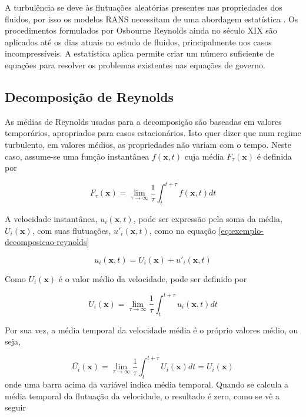 A turbulência se deve às flutuações aleatórias presentes nas propriedades dos fluidos, por isso os modelos RANS necessitam de uma abordagem estatística \cite{Wilcox2006}. Os procedimentos formulados por Osbourne Reynolds ainda no século XIX são aplicados até os dias atuais no estudo de fluidos, principalmente nos casos incompressíveis. A estatística aplica permite criar um número suficiente de equações para resolver os problemas existentes nas equações de governo.

\subsection{Decomposição de Reynolds}

As médias de Reynolds usadas para a decomposição são baseadas em valores temporários, apropriados para casos estacionários. Isto quer dizer que num regime turbulento, em valores médios, as propriedades não variam com o tempo. Neste caso, assume-se uma função instantânea \(f(\textbf{x},t)\) cuja média \(F_{\tau}(\textbf{x})\) é definida por

\begin{equation}
	F_{\tau}(\textbf{x}) = \lim_{\tau \rightarrow \infty} \frac{1}{\tau}\int_{t}^{t+\tau}f(\textbf{x},t)dt
\end{equation}

A velocidade instantânea, \(u_i(\textbf{x},t)\), pode ser expressão pela soma da média, \(U_i(\textbf{x})\), com suas flutuações, \(u'_i(\textbf{x},t)\), como na equação \ref{eq:exemplo-decomposicao-reynolds}

\begin{equation}
	\label{eq:exemplo-decomposicao-reynolds}
	u_{i}(\textbf{x},t) = U_{i}(\textbf{x}) + u'_{i}(\textbf{x},t)
\end{equation} 

Como \(U_{i}(\textbf{x})\) é o valor médio da velocidade, pode ser definido por 

\begin{equation}
	U_{i}(\textbf{x}) = \lim_{\tau \rightarrow \infty} \frac{1}{\tau}\int_{t}^{t+\tau}u_i(\textbf{x},t)dt
\end{equation}

Por sua vez, a média temporal da velocidade média é o próprio valores médio, ou seja,

\begin{equation}
	\overline{U_{i}}(\textbf{x}) = \lim_{\tau \rightarrow \infty} \frac{1}{\tau}\int_{t}^{t+\tau}U_i(\textbf{x})dt = U_i(\textbf{x})
\end{equation}
%
onde uma barra acima da variável indica média temporal. Quando se calcula a média temporal da flutuação da velocidade, o resultado é zero, como se vê a seguir

